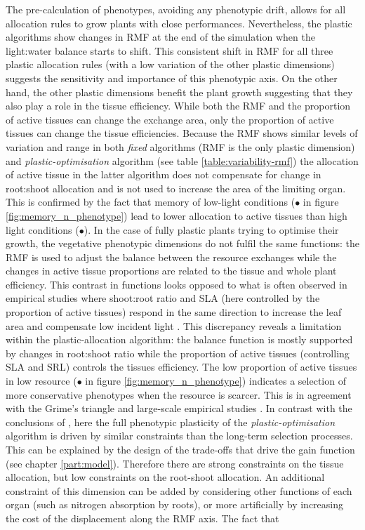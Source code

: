 The pre-calculation of phenotypes, avoiding any phenotypic drift, allows for all allocation rules to grow plants with close performances. Nevertheless, the plastic algorithms show changes in RMF at the end of the simulation when the light:water balance starts to shift. This consistent shift in RMF for all three plastic allocation rules (with a low variation of the other plastic dimensions) suggests the sensitivity and importance of this phenotypic axis. On the other hand, the other plastic dimensions benefit the plant growth suggesting that they also play a role in the tissue efficiency. While both the RMF and the proportion of active tissues can change the exchange area, only the proportion of active tissues can change the tissue efficiencies. Because the RMF shows similar levels of variation and range in both \textit{fixed} algorithms (RMF is the only plastic dimension) and \textit{plastic-optimisation} algorithm (see table \ref{table:variability-rmf}) the allocation of active tissue in the latter algorithm does not compensate for change in root:shoot allocation and is not used to increase the area of the limiting organ. This is confirmed by the fact that memory of low-light conditions (\textcolor{myBlue}{$\bullet$} in figure \ref{fig:memory_n_phenotype}) lead to lower allocation to active tissues than high light conditions (\textcolor{myYellow}{$\bullet$}). In the case of fully plastic plants trying to optimise their growth, the vegetative phenotypic dimensions do not fulfil the same functions: the RMF is used to adjust the balance between the resource exchanges while the changes in active tissue proportions are related to the tissue and whole plant efficiency. This contrast in functions looks opposed to what is often observed in empirical studies where shoot:root ratio and SLA (here controlled by the proportion of active tissues) respond in the same direction to increase the leaf area and compensate low incident light \parencite{ryser_consequences_2000, poorter_causes_2009, poorter_biomass_2012}. This discrepancy reveals a limitation within the plastic-allocation algorithm: the balance function is mostly supported by changes in root:shoot ratio while the proportion of active tissues (controlling SLA and SRL) controls the tissues efficiency. The low proportion of active tissues in low resource (\textcolor{myRed}{$\bullet$} in figure \ref{fig:memory_n_phenotype}) indicates a selection of more conservative phenotypes when the resource is scarcer. This is in agreement with the Grime's triangle \parencite{grime_evidence_1977} and large-scale empirical studies \parencite{wright_worldwide_2004}. In contrast with the conclusions of \cite{ryser_consequences_2000}, here the full phenotypic plasticity of the \textit{plastic-optimisation} algorithm is driven by similar constraints than the long-term selection processes. This can be explained by the design of the trade-offs that drive the gain function (see chapter \ref{part:model}). Therefore there are strong constraints on the tissue allocation, but low constraints on the root-shoot allocation. An additional constraint of this dimension can be added by considering other functions of each organ (such as nitrogen absorption by roots), or more artificially by increasing the cost of the displacement along the RMF axis. The fact that 